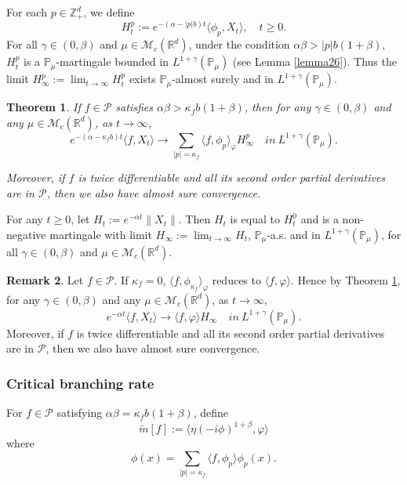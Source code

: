 \documentclass[12pt,a4paper]{amsart}
\theoremstyle{plain}
\newtheorem{thm}{Theorem}[section]
\theoremstyle{definition}
\newtheorem{rem}[thm]{Remark}
\numberwithin{equation}{section}
\begin{document}
For each $p\in \mathbb{Z}_+^d$, we define
$$H_t^p:= e^{-(\alpha-|p|b)t}\langle\phi_p,X_t\rangle,\quad t\geq 0.$$
  For all $\gamma\in (0, \beta)$ and $\mu\in \mathcal M_c(\mathbb R^d)$,
  under the condition
   $\alpha\beta>|p|b(1+\beta)$,
   $H_t^p$ is a $\mathbb{P}_{\mu}$-martingale bounded in
   $L^{1+\gamma}(\mathbb{P}_{\mu})$ (see Lemma \ref{lemma26}).
  Thus the limit $H^p_{\infty}:=\lim_{t\rightarrow \infty}H_t^p$ exists $\mathbb{P}_{\mu}$-almost surely and in $L^{1+\gamma}(\mathbb{P}_{\mu})$.
 \begin{thm}\label{Theorem11}
     If $f \in \mathcal{P}$ satisfies $\alpha\beta>\kappa_fb(1+\beta)$, then for
any $\gamma\in (0, \beta)$ and any $\mu\in \mathcal M_c(\mathbb R^d)$,
     as $t\rightarrow \infty$,
     $$e^{-(\alpha-\kappa_fb)t}\langle f, X_t\rangle \rightarrow\sum_{|p|=\kappa_f}\langle f, \phi_p\rangle_{\varphi} H_{\infty}^p \quad in~ L^{1+\gamma}(\mathbb{P}_{\mu}).$$

     Moreover, if $f$ is twice differentiable and all its second order partial derivatives are in $\mathcal{P}$, then we also have almost sure convergence.
 \end{thm}
For any $t\geq 0$, let $H_t:=e^{-\alpha t}\|X_t\|$. Then $H_t$ is equal to $H_t^0$ and is a non-negative martingale with limit $H_{\infty}:=\lim_{t\rightarrow\infty}H_t$,  $\mathbb{P}_{\mu}$-a.s. and in $L^{1+\gamma}(\mathbb{P}_{\mu})$, for all $\gamma\in (0, \beta)$ and $\mu\in \mathcal M_c(\mathbb R^d)$.
 \begin{rem}
Let $f \in \mathcal{P}$.  If $\kappa_f=0$,
    $\langle f, \phi_{\kappa_f}\rangle_{\varphi}$ reduces to $\langle f,\varphi\rangle$. Hence by Theorem \ref{Theorem11},
for any $\gamma\in (0, \beta)$ and any $\mu\in \mathcal M_c(\mathbb R^d)$, as $t\rightarrow \infty$,
     $$e^{-\alpha t}\langle f, X_t\rangle \rightarrow \langle f, \varphi\rangle H_{\infty} \quad in~ L^{1+\gamma}(\mathbb{P}_{\mu}).$$
    Moreover, if $f$ is twice differentiable and all its second order partial derivatives are in $\mathcal{P}$, then we also have almost sure convergence.
 \end{rem}

\subsubsection{Critical branching rate}
    For $f\in \mathcal{P}$ satisfying $\alpha\beta=\kappa_f b(1+\beta)$, define
\begin{equation}\label{tilde-m}
    \widetilde{m}[f]
    := \langle \eta (-i\phi)^{1+\beta},\varphi\rangle
\end{equation}
    where
\[
    \phi(x)
    =\sum_{|p|=\kappa_f}\langle f,\phi_p\rangle\phi_p(x).
\]
\end{document}
